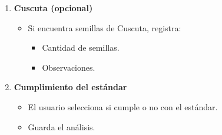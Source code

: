 \begin{enumerate}[nosep]
\begin{itemize}[nosep]
        \item Para cada registro ingresa:
        \begin{itemize}[nosep]
            \item Catálogo o especie.
            \item Cantidad de semillas.
            \item Categoría aplicable.
        \end{itemize}
    \end{itemize}
    \item \textbf{Cuscuta (opcional)}
    \begin{itemize}[nosep]
        \item Si encuentra semillas de Cuscuta, registra:
        \begin{itemize}[nosep]
            \item Cantidad de semillas.
            \item Observaciones.
        \end{itemize}
    \end{itemize}
    \item \textbf{Cumplimiento del estándar}
    \begin{itemize}[nosep]
        \item El usuario selecciona si cumple o no con el estándar.
        \item Guarda el análisis.
    \end{itemize}
\end{enumerate}

